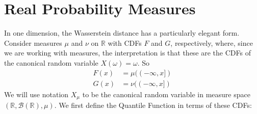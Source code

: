 \documentclass[11pt,a4paper]{article}
\newtheorem{theorem}{Theorem}[section]
\theoremstyle{remark}
\begin{document}




\section{Real Probability Measures}

In one dimension, the Wasserstein distance has a particularly elegant form. Consider measures \( \mu \) and \( \nu \) on \( \mathbb{R} \) with CDFs \( F \) and \( G \), respectively, where, since we are working with measures, the interpretation is that these are the CDFs of the canonical random variable $X(\omega) = \omega$. So \begin{align*}F(x) &= \mu ((-\infty, x]) \\ G(x) &= \nu ((-\infty, x])\end{align*}
We will use notation $X_\mu$ to be the canonical random variable in measure space $(\mathbb{R}, \mathcal{B}(\mathbb{R}), \mu)$. We first define the Quantile Function in terms of these CDFs:
\end{document}
